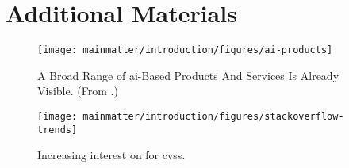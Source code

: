 \chapter{Additional Materials}
\label{ch:additional-materials}

\cleardoublepage



\clearpage

\begin{figure}[p!]
\centering
\caption[Categorisation of AI-based products and services]{A Broad Range of \gls{ai}-Based Products And Services Is Already Visible. (From \citep{LoGiudice:2016wf}.)}
\label{fig:introduction:ai-products}
\texttt{[image: mainmatter/introduction/figures/ai-products]}
\end{figure}

\begin{figure}[p!]
\centering
\caption[Increasing interest in the developer community of computer vision services]{Increasing interest on  for \glspl{cvs}.}
\label{fig:introduction:stackoverflow-trends}
\texttt{[image: mainmatter/introduction/figures/stackoverflow-trends]}
\end{figure}